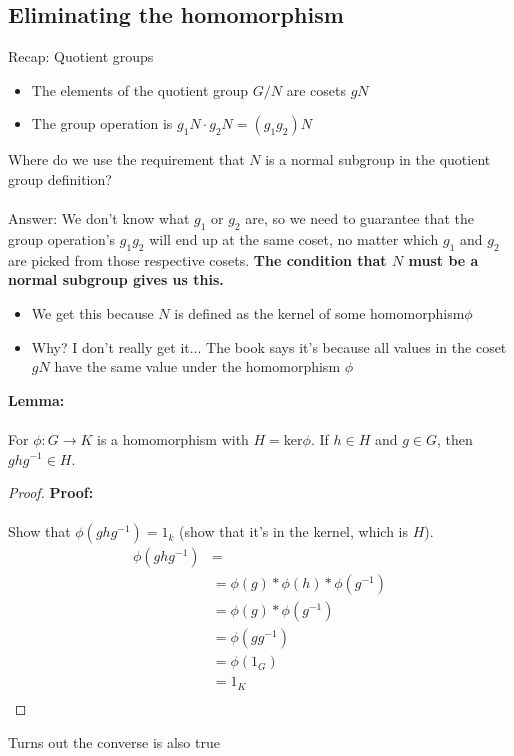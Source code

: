 \documentclass{article}
\begin{document}
\subsection{Eliminating the homomorphism}
Recap: Quotient groups
\begin{itemize}
	\item The elements of the quotient group $G /N$ are cosets $gN$
	\item The group operation is $g_1N \cdot g_2N= (g_1g_2)N$
\end{itemize}
Where do we use the requirement that $N$ is a normal subgroup in the quotient group definition?
~\\
~\\
Answer: We don't know what $g_1$ or $g_2$ are, so we need to guarantee that the group operation's $g_1g_2$ will end up at the same coset, no matter which $g_1$ and $g_2$ are picked from those respective cosets. \textbf{The condition that $N$ must be a normal subgroup gives us this.}
\begin{itemize}
	\item We get this because $N$ is defined as the kernel of some homomorphism$\phi$
	\item Why? I don't really get it... The book says it's because all values in the coset $gN$ have the same value under the homomorphism $\phi$
\end{itemize}
\begin{lemma} 
\textbf{Lemma:} \\
~\\
For $\phi: G \to K$ is a homomorphism with $H=$ker$\phi$. If $h\in H$ and $g\in G$, then $ghg^{-1} \in H$.
\begin{proof} 
\textbf{Proof:} \\
~\\
Show that $\phi(ghg^{-1}) = 1_k$ (show that it's in the kernel, which is $H$).
\begin{align}
	\phi(ghg^{-1}) &= \\ 
		       &= \phi(g) * \phi(h) * \phi(g^{-1}) \\
		       &= \phi(g) * \phi(g^{-1}) \\
		       &= \phi(gg^{-1}) \\
		       &= \phi(1_G) \\
		       &= 1_K \\
\end{align}
\end{proof}
\end{lemma}
Turns out the converse is also true
\end{document}
